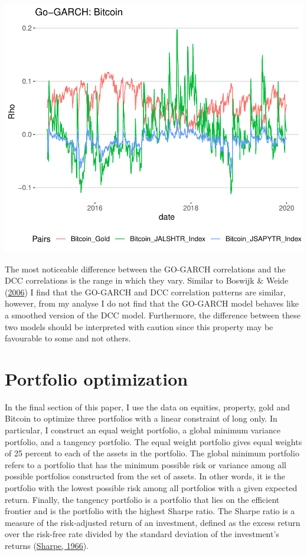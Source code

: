 \documentclass[11pt,preprint, authoryear]{elsarticle}
\numberwithin{equation}{section}
\numberwithin{figure}{section}
\numberwithin{table}{section}
\begin{document}
\includegraphics{FinMetrics-Essay_files/figure-latex/unnamed-chunk-17-1.pdf}

The most noticeable difference between the GO-GARCH correlations and the
DCC correlations is the range in which they vary. Similar to Boswijk \&
Weide (\protect\hyperlink{ref-boswijk2006wake}{2006}) I find that the
GO-GARCH and DCC correlation patterns are similar, however, from my
analyse I do not find that the GO-GARCH model behaves like a smoothed
version of the DCC model. Furthermore, the difference between these two
models should be interpreted with caution since this property may be
favourable to some and not others.

\hypertarget{portfolio-optimization}{%
\section{Portfolio optimization}\label{portfolio-optimization}}

In the final section of this paper, I use the data on equities,
property, gold and Bitcoin to optimize three portfolios with a linear
constraint of long only. In particular, I construct an equal weight
portfolio, a global minimum variance portfolio, and a tangency
portfolio. The equal weight portfolio gives equal weights of 25 percent
to each of the assets in the portfolio. The global minimum portfolio
refers to a portfolio that has the minimum possible risk or variance
among all possible portfolios constructed from the set of assets. In
other words, it is the portfolio with the lowest possible risk among all
portfolios with a given expected return. Finally, the tangency portfolio
is a portfolio that lies on the efficient frontier and is the portfolio
with the highest Sharpe ratio. The Sharpe ratio is a measure of the
risk-adjusted return of an investment, defined as the excess return over
the risk-free rate divided by the standard deviation of the investment's
returns (\protect\hyperlink{ref-sharpe1966mutual}{Sharpe, 1966}).
\end{document}
